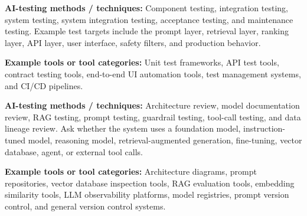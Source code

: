 \documentclass[
  letterpaper,
  DIV=11,
  numbers=noendperiod,
  oneside]{scrreprt}
\begin{document}
\begin{tcolorbox}[enhanced jigsaw, arc=.35mm, bottomrule=.15mm, bottomtitle=1mm, breakable, colback=white, colbacktitle=quarto-callout-tip-color!10!white, colframe=quarto-callout-tip-color-frame, coltitle=black, left=2mm, leftrule=.75mm, opacityback=0, opacitybacktitle=0.6, rightrule=.15mm, title=\textcolor{quarto-callout-tip-color}{\faLightbulb}\hspace{0.5em}{Which test levels do we use, and what is tested at each level?}, titlerule=0mm, toprule=.15mm, toptitle=1mm]

\textbf{AI-testing methods / techniques:} Component testing, integration
testing, system testing, system integration testing, acceptance testing,
and maintenance testing. Example test targets include the prompt layer,
retrieval layer, ranking layer, API layer, user interface, safety
filters, and production behavior.

\textbf{Example tools or tool categories:} Unit test frameworks, API
test tools, contract testing tools, end-to-end UI automation tools, test
management systems, and CI/CD pipelines.

\end{tcolorbox}

\begin{tcolorbox}[enhanced jigsaw, arc=.35mm, bottomrule=.15mm, bottomtitle=1mm, breakable, colback=white, colbacktitle=quarto-callout-tip-color!10!white, colframe=quarto-callout-tip-color-frame, coltitle=black, left=2mm, leftrule=.75mm, opacityback=0, opacitybacktitle=0.6, rightrule=.15mm, title=\textcolor{quarto-callout-tip-color}{\faLightbulb}\hspace{0.5em}{What is the architecture of the LLM system?}, titlerule=0mm, toprule=.15mm, toptitle=1mm]

\textbf{AI-testing methods / techniques:} Architecture review, model
documentation review, RAG testing, prompt testing, guardrail testing,
tool-call testing, and data lineage review. Ask whether the system uses
a foundation model, instruction-tuned model, reasoning model,
retrieval-augmented generation, fine-tuning, vector database, agent, or
external tool calls.

\textbf{Example tools or tool categories:} Architecture diagrams, prompt
repositories, vector database inspection tools, RAG evaluation tools,
embedding similarity tools, LLM observability platforms, model
registries, prompt version control, and general version control systems.

\end{tcolorbox}
\end{document}
